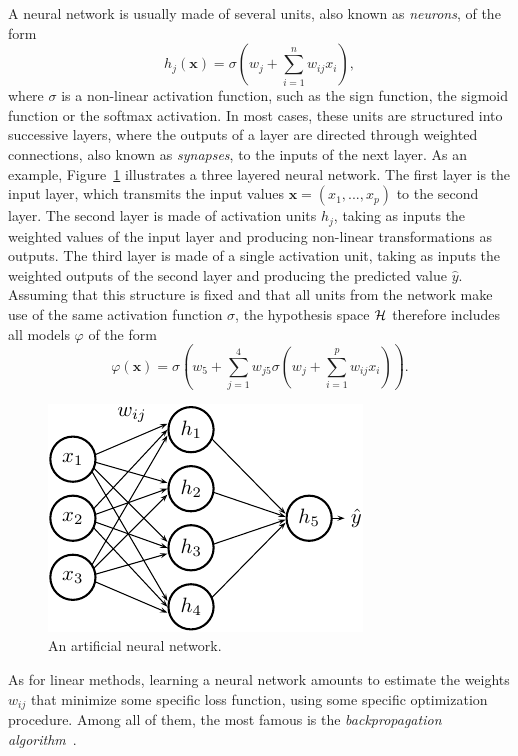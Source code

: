 A neural network is usually made of several units, also known as \textit{neurons}, of the form
\begin{equation}
h_j(\mathbf{x}) = \sigma(w_j + \sum_{i=1}^n w_{ij} x_i),
\end{equation}
where $\sigma$ is a non-linear activation function, such as the sign function,
the sigmoid function or the softmax activation. In most cases, these units are
structured into successive layers, where the outputs of a layer are directed
through weighted connections, also known as \textit{synapses}, to the inputs of
the next layer. As an example, Figure~\ref{fig:mlp} illustrates a three layered
neural network. The first layer is the input layer, which transmits the input
values $\mathbf{x} = (x_1, ..., x_p)$ to the second layer. The second layer is
made of activation units $h_j$, taking as inputs the weighted values of the
input layer and producing non-linear transformations as outputs. The third
layer is made of a single activation unit, taking as inputs the weighted
outputs of the second layer and producing the predicted value $\hat{y}$.
Assuming that this structure is fixed and that all units from the network make
use of the same activation function $\sigma$, the hypothesis space ${\cal H}$
therefore includes all models $\varphi$ of the form
\begin{equation}
\varphi(\mathbf{x}) = \sigma(w_5 + \sum_{j=1}^4 w_{j5} \sigma(w_j + \sum_{i=1}^p w_{ij} x_i)).
\end{equation}

\begin{figure}
    \centering
    \includegraphics[scale=1.0]{figures/ch2_mlp.pdf}
    \caption{An artificial neural network.}
    \label{fig:mlp}
\end{figure}

As for linear methods, learning a neural network  amounts to estimate the
weights $w_{ij}$ that minimize some specific loss function, using some specific
optimization procedure. Among all of them, the most famous is the
\textit{backpropagation algorithm}~\citep{bryson:1975}.

